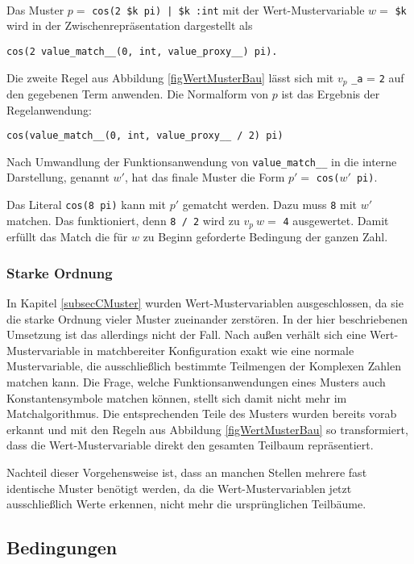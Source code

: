 \begin{beispiel}~\\
Das Muster $p =$ \verb~cos(2 $k pi) | $k :int~ mit der Wert-Mustervariable $w =$ \verb|$k| wird in der Zwischenrepräsentation dargestellt als 
\begin{verbatim}
cos(2 value_match__(0, int, value_proxy__) pi). 
\end{verbatim}
Die zweite Regel aus Abbildung \ref{figWertMusterBau} lässt sich mit $v_p$ \verb|_a| = \verb|2| auf den gegebenen Term anwenden. Die Normalform von $p$ ist das Ergebnis der Regelanwendung:
\begin{verbatim}
cos(value_match__(0, int, value_proxy__ / 2) pi)
\end{verbatim}
Nach Umwandlung der Funktionsanwendung von \verb|value_match__| in die interne Darstellung, genannt $w'$, hat das finale Muster die Form $p' =$ \verb|cos(|$w'$\verb| pi)|. 


Das Literal \verb|cos(8 pi)| kann mit $p'$ gematcht werden. Dazu muss \verb|8| mit $w'$ matchen. Das funktioniert, denn \verb|8 / 2| wird zu $v_p~w =$ \verb|4| ausgewertet. Damit erfüllt das Match die für $w$ zu Beginn geforderte Bedingung der ganzen Zahl. 
\end{beispiel}

\subsubsection{Starke Ordnung}
In Kapitel \ref{subsecCMuster} wurden Wert-Mustervariablen ausgeschlossen, da sie die starke Ordnung vieler Muster zueinander zerstören. In der hier beschriebenen Umsetzung ist das allerdings nicht der Fall. Nach außen verhält sich eine Wert-Mustervariable in matchbereiter Konfiguration exakt wie eine normale Mustervariable, die ausschließlich bestimmte Teilmengen der Komplexen Zahlen matchen kann. Die Frage, welche Funktionsanwendungen eines Musters auch Konstantensymbole matchen können, stellt sich damit nicht mehr im Matchalgorithmus. Die entsprechenden Teile des Musters wurden bereits vorab erkannt und mit den Regeln aus Abbildung \ref{figWertMusterBau} so transformiert, dass die Wert-Mustervariable direkt den gesamten Teilbaum repräsentiert.

Nachteil dieser Vorgehensweise ist, dass an manchen Stellen mehrere fast identische Muster benötigt werden, da die Wert-Mustervariablen jetzt ausschließlich Werte erkennen, nicht mehr die ursprünglichen Teilbäume. 


\subsection{Bedingungen} \label{subsubsecBedingungen}

